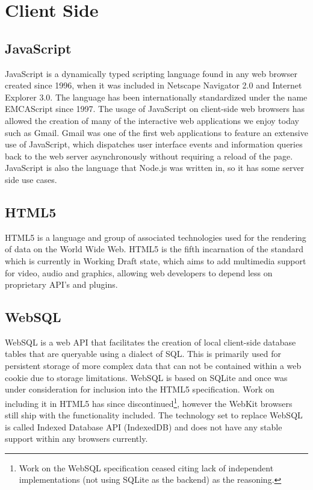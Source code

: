 \documentclass[12pt]{report}	%
\theoremstyle{definition}
\theoremstyle{remark}
\begin{document}
\section{Client Side}

\subsection{JavaScript}

JavaScript is a dynamically typed scripting language found in any web
browser created since 1996, when it was included in Netscape Navigator
2.0 and Internet Explorer 3.0. The language has been internationally
standardized under the name EMCAScript since 1997. The usage of
JavaScript on client-side web browsers has allowed the creation of
many of the interactive web applications we enjoy today such as Gmail.
Gmail was one of the first web applications to feature an extensive use
of JavaScript, which dispatches user interface events and information
queries back to the web server asynchronously without requiring a reload
of the page. JavaScript is also the language that Node.js was written
in, so it has some server side use cases.

\subsection{HTML5}

HTML5 is a language and group of associated technologies used for the
rendering of data on the World Wide Web. HTML5 is the fifth incarnation
of the standard which is currently in Working Draft state, which aims to 
add multimedia support for video, audio and graphics, allowing web 
developers to depend less on proprietary API's and plugins.

\subsection{WebSQL}

WebSQL is a web API that facilitates the creation of local client-side
database tables that are queryable using a dialect of SQL. This is
primarily used for persistent storage of more complex data that can not
be contained within a web cookie due to storage limitations. WebSQL is
based on SQLite and once was under consideration for inclusion into the
HTML5 specification. Work on including it in HTML5 has since
discontinued\footnote{Work on the WebSQL specification ceased citing lack 
of independent implementations (not using SQLite as the backend) as the reasoning.}, however the WebKit browsers still ship with the
functionality included. The technology set to replace WebSQL is called
Indexed Database API (IndexedDB) and does not have any stable support
within any browsers currently.
\end{document}
